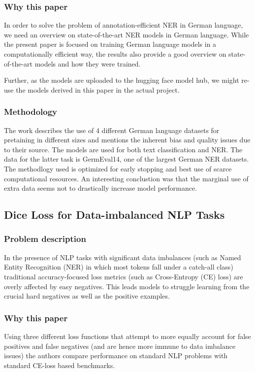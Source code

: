 \documentclass[11pt]{article}
\begin{document}
\subsubsection{Why this paper}
In order to solve the problem of annotation-efficient NER in German language, we need an overview on state-of-the-art NER models in German language. While the present paper is focused on training German language models in a computationally efficient way, the results also provide a good overview on state-of-the-art models and how they were trained.

Further, as the models are uploaded to the hugging face model hub, we might re-use the models derived in this paper in the actual project. 

\subsubsection{Methodology}
The work describes the use of 4 different German language datasets for pretaining in different sizes and mentions the inherent bias and quality issues due to their source. The models are used for both text classification and NER. The data for the latter task is GermEval14, one of the largest German NER datasets. The methodlogy used is optimized for early stopping and best use of scarce computational resources. An interesting conclustion was that the marginal use of extra data seems not to drastically increase model performance. 


\subsection{Dice Loss for Data-imbalanced NLP Tasks \citet{li-etal-2020-dice}}

\subsubsection{Problem description}
In the presence of NLP tasks with significant data imbalances (such as Named Entity Recognition (NER) in which most tokens fall under a catch-all class) traditional accuracy-focused loss metrics (such as Cross-Entropy (CE) loss) are overly affected by easy negatives. This leads models to struggle learning from the crucial hard negatives as well as the positive examples.
\subsubsection{Why this paper}
Using three different loss functions that attempt to more equally account for false positives and false negatives (and are hence more immune to data imbalance issues) the authors compare performance on standard NLP problems with standard CE-loss based benchmarks.
\end{document}
